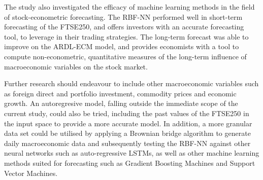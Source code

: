 \documentclass[11pt,a4paper]{article}
\begin{document}
The study also investigated the efficacy of machine learning methods in 
the field of stock-econometric forecasting. The RBF-NN performed well in
short-term forecasting of the FTSE250, and offers investors with an accurate forecasting tool, 
to leverage in their trading strategies. The long-term forecast was able to improve on the ARDL-ECM model, and provides 
economists with a tool to compute non-econometric, quantitative measures of the 
long-term influence of macroeconomic variables on the stock market. 

Further research should endeavour to include other macroeconomic variables such as 
foreign direct and portfolio investment, commodity prices and economic growth.
An autoregresive model, falling outside the immediate scope of the current study, could also be tried, including the past values of the 
FTSE250 in the input space to provide a more accurate model. In addition, 
a more granular data set could be utilised by applying a 
Brownian bridge algorithm to generate daily macroeconomic data and 
subsequently testing the RBF-NN against other neural networks 
such as auto-regressive LSTMs, as well as other machine learning methods suited for 
forecasting such as Gradient Boosting Machines and Support Vector Machines. 



\end{document}
